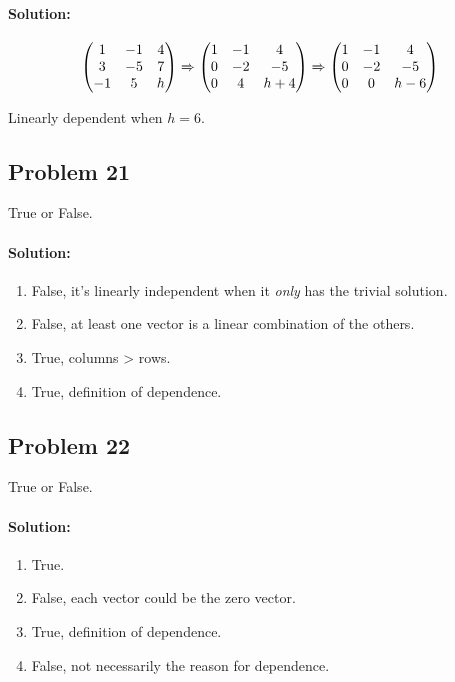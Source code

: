 \documentclass[11pt, notitlepage]{report}
\newenvironment{solution}{\paragraph{\small Solution:}}{\hfill}
\begin{document}
\begin{solution}

\[
\left(\begin{matrix}{}
  1&-1 &4 \\
  3&-5 &7 \\
  -1&5 &h
\end{matrix}\right)
\xRightarrow{}
\left(\begin{matrix}{}
  1&-1 &4 \\
  0&-2 &-5 \\
  0&4 &h+4
\end{matrix}\right)
\xRightarrow{}
\left(\begin{matrix}{}
  1&-1 &4 \\
  0&-2 &-5 \\
  0&0 &h-6
\end{matrix}\right)
\]

Linearly dependent when $h=6$.
\end{solution}

\subsection{Problem 21}
True or False.
\begin{solution}
\begin{enumerate}[label=\alph*.)]
	\item False, it's linearly independent when it \textit{only} has the trivial solution.
	\item False, at least one vector is a linear combination of the others.
	\item True, columns > rows.
	\item True, definition of dependence.
\end{enumerate}
\end{solution}

\subsection{Problem 22}
True or False.
\begin{solution}
\begin{enumerate}[label=\alph*.)]
	\item True.
	\item False, each vector could be the zero vector.
	\item True, definition of dependence.
	\item False, not necessarily the reason for dependence.
\end{enumerate}
\end{solution}
\end{document}

